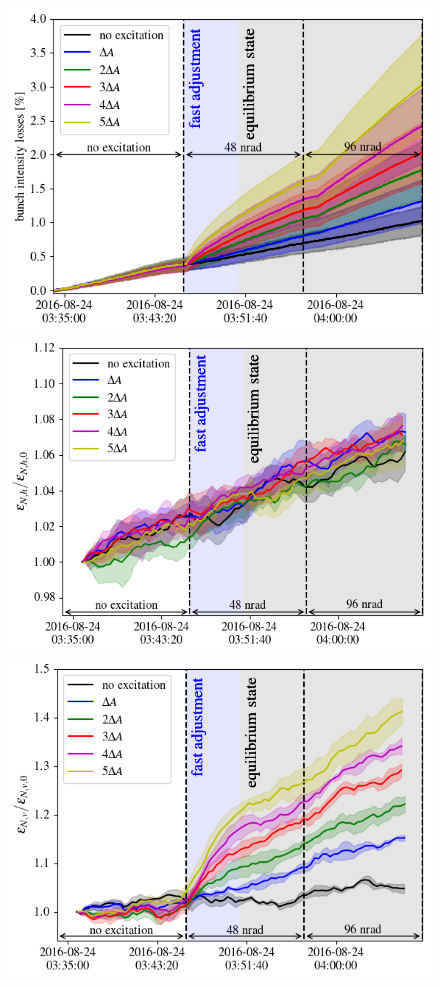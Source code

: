\documentclass[%
 reprint,
 amsmath,amssymb,
 aps,
prstab,
]{revtex4-1}
\begin{document}
\begin{figure}[h]
	\begin{minipage}[t]{1.0\linewidth}
		\centering
		\includegraphics[width=0.49\linewidth]{bunch_intensity_v10th_no_damper_avg.png}
	\end{minipage}
	\begin{minipage}[t]{0.49\linewidth}
		\centering
		\includegraphics[width=1.0\linewidth]{emith_avg_rel_v10th_no_damper.png}
	\end{minipage}	
	\begin{minipage}[t]{0.49\linewidth}
		\centering
		\includegraphics[width=1.0\linewidth]{emitv_avg_rel_v10th_no_damper.png}

\end{minipage}
\end{figure}
\end{document}
